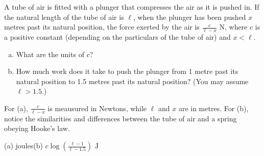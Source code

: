 \begin{Mquestion}
A tube of air is fitted with a plunger that compresses the air as it is pushed in. If the natural length of the tube of air is $\ell$, when the plunger has been pushed  $x$ metres past its natural position, the force exerted by the air is $\frac{c}{\ell-x}$ N, where $c$ is a positive constant (depending on the particulars of the tube of air) and $x<\ell$.
\begin{center}
\end{center}
\begin{enumerate}[(a)]
\item What are the units of $c$?
\item How much work does it take to push the plunger from 1 metre past its natural position to 1.5 metres past its natural position? (You may assume $\ell>1.5$.)
\end{enumerate}
\end{Mquestion}
\begin{hint}
For (a), $\frac{c}{\ell-x}$ is meausured in Newtons, while $\ell$ and $x$ are in metres. For (b), notice the similarities and differences between the tube of air and a spring obeying Hooke's law.
\end{hint}
\begin{answer}
(a) joules\qquad (b) $\displaystyle c\log\left(\frac{\ell-1}{\ell-1.5}\right)\text{ J}$
\end{answer}
